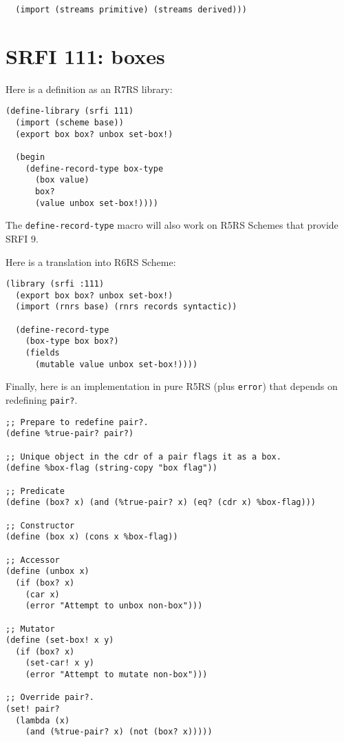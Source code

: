 \begin{verbatim}
  (import (streams primitive) (streams derived)))
\end{verbatim}

\section{SRFI 111: boxes}

Here is a definition as an R7RS library:

\begin{verbatim}
(define-library (srfi 111)
  (import (scheme base))
  (export box box? unbox set-box!)
  
  (begin
    (define-record-type box-type
      (box value)
      box?
      (value unbox set-box!))))
\end{verbatim}

The \texttt{define-record-type} macro will also work on R5RS Schemes
that provide SRFI 9.

Here is a translation into R6RS Scheme:

\begin{verbatim}
(library (srfi :111)
  (export box box? unbox set-box!)
  (import (rnrs base) (rnrs records syntactic))
  
  (define-record-type
    (box-type box box?)
    (fields
      (mutable value unbox set-box!))))
\end{verbatim}

Finally, here is an implementation in pure R5RS (plus \texttt{error})
that depends on redefining \texttt{pair?}.

\begin{verbatim}
;; Prepare to redefine pair?.
(define %true-pair? pair?)

;; Unique object in the cdr of a pair flags it as a box.
(define %box-flag (string-copy "box flag"))

;; Predicate
(define (box? x) (and (%true-pair? x) (eq? (cdr x) %box-flag)))

;; Constructor
(define (box x) (cons x %box-flag))

;; Accessor
(define (unbox x)
  (if (box? x)
    (car x)
    (error "Attempt to unbox non-box")))
    
;; Mutator
(define (set-box! x y)
  (if (box? x)
    (set-car! x y)
    (error "Attempt to mutate non-box")))

;; Override pair?.
(set! pair?
  (lambda (x)
    (and (%true-pair? x) (not (box? x)))))
\end{verbatim}


